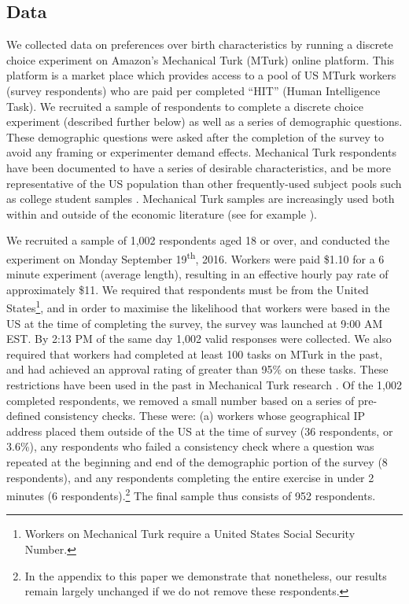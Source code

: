 \documentclass[a4paper, 11pt]{article}
\begin{document}
\begin{spacing}{1.4}
\section{Data}
\label{scn:data}
We collected data on preferences over birth characteristics by running a
discrete choice experiment on Amazon's Mechanical Turk (MTurk) online platform.
This platform is a market place which provides access to a pool of US MTurk
workers (survey respondents) who are paid per completed ``HIT'' (Human
Intelligence Task).  We recruited a sample of respondents to complete a
discrete choice experiment (described further below) as well as a series of
demographic questions.  These demographic questions were asked after the
completion of the survey to avoid any framing or experimenter demand effects.
Mechanical Turk respondents have been documented to have a series of desirable
characteristics, and be more representative of the US population than other
frequently-used subject pools such as college student samples
\citep{Berinskyetal2012}.  Mechanical Turk samples are increasingly used both
within and outside of the economic literature (see for example
\citet{Kuziemkoetal2015,Jordanetal2016}).

We recruited a sample of 1,002 respondents aged 18 or over, and conducted
the experiment on Monday September 19\textsuperscript{th}, 2016.  Workers
were paid \$1.10 for a 6 minute experiment (average length), resulting in
an effective hourly pay rate of approximately \$11.  We required that
respondents must be from the United States\footnote{Workers on Mechanical
  Turk require a United States Social Security Number.}, and in order to
maximise the likelihood that workers were based in the US at the time of
completing the survey, the survey was launched at 9:00 AM EST.  By 2:13 PM
of the same day 1,002 valid responses were collected.  We also required
that workers had completed at least 100 tasks on MTurk in the past, and
had achieved an approval rating of greater than 95\% on these tasks.
These restrictions have been used in the past in Mechanical Turk research
\citep{Berinskyetal2012,Francis-TanMialon2015}.  Of the 1,002 completed
respondents, we removed a small number based on a series of pre-defined
consistency checks.  These were: (a) workers whose geographical IP address
placed them outside of the US at the time of survey (36 respondents, or
3.6\%), any respondents who failed a consistency check where a question was
repeated at the beginning and end of the demographic portion of the survey
(8 respondents), and any respondents completing the entire exercise in
under 2 minutes (6 respondents).\footnote{In the appendix to this paper we
  demonstrate that nonetheless, our results remain largely unchanged if we
  do not remove these respondents.}  The final sample thus consists of 952
respondents.


\end{spacing}
\end{document}
